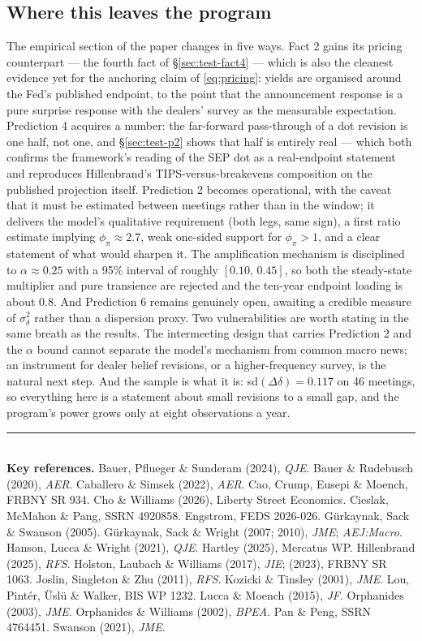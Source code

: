\documentclass[11pt]{article}
\begin{document}
\subsection{Where this leaves the program}
The empirical section of the paper changes in five ways. Fact 2 gains its
pricing counterpart --- the fourth fact of \S\ref{sec:test-fact4} --- which is
also the cleanest evidence yet for the anchoring claim of \eqref{eq:pricing}:
yields are organised around the Fed's published endpoint, to the point that the
announcement response is a pure surprise response with the dealers' survey as
the measurable expectation. Prediction 4 acquires a number: the far-forward
pass-through of a dot revision is one half, not one, and \S\ref{sec:test-p2}
shows that half is entirely real --- which both confirms the framework's
reading of the SEP dot as a real-endpoint statement and reproduces
Hillenbrand's TIPS-versus-breakevens composition on the published projection
itself. Prediction 2 becomes operational, with the caveat that it must be
estimated between meetings rather than in the window; it delivers the model's
qualitative requirement (both legs, same sign), a first ratio estimate implying
$\phi_\pi\approx2.7$, weak one-sided support for $\phi_\pi>1$, and a clear
statement of what would sharpen it. The amplification mechanism is
disciplined to $\alpha\approx0.25$ with a 95\% interval of roughly
$[0.10,\,0.45]$, so both the steady-state multiplier and pure transience are
rejected and the ten-year endpoint loading is about $0.8$. And Prediction 6
remains genuinely open, awaiting a credible measure of $\sigma^2_\delta$ rather
than a dispersion proxy.
Two vulnerabilities are worth stating in the same breath as the results. The
intermeeting design that carries Prediction 2 and the $\alpha$ bound cannot
separate the model's mechanism from common macro news; an instrument for
dealer belief revisions, or a higher-frequency survey, is the natural next
step. And the sample is what it is: sd$(\Delta\delta)=0.117$ on 46 meetings,
so everything here is a statement about small revisions to a small gap, and
the program's power grows only at eight observations a year.
\vspace{0.9em}
\noindent\rule{\textwidth}{0.4pt}\\[0.2em]
\scriptsize\textbf{Key references.} Bauer, Pflueger \& Sunderam (2024), \emph{QJE}. Bauer \&
Rudebusch (2020), \emph{AER}. Caballero \& Simsek (2022), \emph{AER}. Cao, Crump, Eusepi \&
Moench, FRBNY SR 934. Cho \& Williams (2026), Liberty Street Economics. Cieslak, McMahon \&
Pang, SSRN 4920858. Engstrom, FEDS 2026-026. G\"urkaynak, Sack \& Swanson (2005). G\"urkaynak,
Sack \& Wright (2007; 2010), \emph{JME}; \emph{AEJ:Macro}. Hanson,
Lucca \& Wright (2021), \emph{QJE}. Hartley (2025), Mercatus WP. Hillenbrand (2025),
\emph{RFS}. Holston, Laubach \& Williams (2017), \emph{JIE}; (2023), FRBNY SR 1063. Joslin,
Singleton \& Zhu (2011), \emph{RFS}. Kozicki \& Tinsley (2001), \emph{JME}. Lou, Pint\'er,
\"Usl\"u \& Walker, BIS WP 1232. Lucca \& Moench (2015), \emph{JF}. Orphanides (2003),
\emph{JME}. Orphanides \& Williams (2002), \emph{BPEA}. Pan \& Peng, SSRN 4764451. Swanson
(2021), \emph{JME}.
\end{document}
